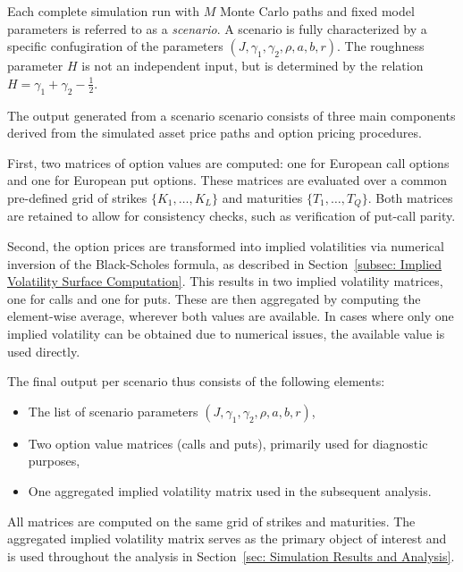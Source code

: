 Each complete simulation run with $M$ Monte Carlo paths and fixed model parameters is referred to as a \emph{scenario}. A scenario is fully characterized by a specific confugiration of the parameters $(J, \gamma_1, \gamma_2, \rho, a, b, r)$. The roughness parameter $H$ is not an independent input, but is determined by the relation $H = \gamma_1 + \gamma_2 - \frac{1}{2}$.

The output generated from a scenario scenario consists of three main components derived from the simulated asset price paths and option pricing procedures.

First, two matrices of option values are computed: one for European call options and one for European put options. These matrices are evaluated over a common pre-defined grid of strikes $\{K_1, \ldots, K_L\}$ and maturities $\{T_1, \ldots, T_Q\}$. Both matrices are retained to allow for consistency checks, such as verification of put-call parity.

Second, the option prices are transformed into implied volatilities via numerical inversion of the Black-Scholes formula, as described in Section~\ref{subsec: Implied Volatility Surface Computation}. This results in two implied volatility matrices, one for calls and one for puts. These are then aggregated by computing the element-wise average, wherever both values are available. In cases where only one implied volatility can be obtained due to numerical issues, the available value is used directly.

The final output per scenario thus consists of the following elements: 
\begin{itemize}
    \item The list of scenario parameters $(J, \gamma_1, \gamma_2, \rho, a, b, r)$,
    \item Two option value matrices (calls and puts), primarily used for diagnostic purposes,
    \item One aggregated implied volatility matrix used in the subsequent analysis.
\end{itemize}

All matrices are computed on the same grid of strikes and maturities. The aggregated implied volatility matrix serves as the primary object of interest and is used throughout the analysis in Section~\ref{sec: Simulation Results and Analysis}.